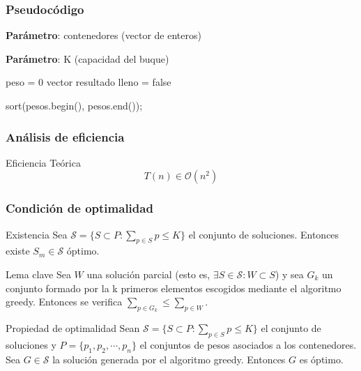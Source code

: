 \documentclass[13pt]{beamer}
\begin{document}
	\begin{frame}
		\frametitle{Pseudocódigo}
		\begin{algorithm}[H]
			\begin{minipage}{0.92\textwidth}
			\textbf{Parámetro}: contenedores (vector de enteros)
		
			\textbf{Parámetro}: K (capacidad del buque)
		
			\end{minipage}
		
			peso = 0\;
			vector resultado\;
			lleno = false\;
		
			sort(pesos.begin(), pesos.end());

			 {
			}

			
		\end{algorithm}
	\end{frame}

	\begin{frame}
		\frametitle{Análisis de eficiencia}
		\begin{block}{Eficiencia Teórica}
			$$T(n) \in \mathcal{O}(n^2)$$
		\end{block}
	\end{frame}

	\begin{frame}
		\frametitle{Condición de optimalidad}

		\begin{block}{Existencia}
			Sea $\mathcal{S} = \{S \subset P : \sum_{p \in S} p \leq K\}$ el conjunto de soluciones. Entonces
			existe $S_m \in \mathcal S$ óptimo. 
		\end{block}

		\begin{alertblock}{Lema clave}
			Sea $W$ una solución parcial (esto es, $\exists S \in \mathcal S: W \subset S$) y sea $G_k$ un conjunto formado
			por la k primeros elementos escogidos mediante el algoritmo greedy. 
			Entonces se verifica $\sum_{p \in G_k} \leq \sum_{p \in W}$. 
		\end{alertblock}

		\begin{alertblock}{Propiedad de optimalidad}
			Sean $\mathcal{S} = \{S \subset P : \sum_{p \in S} p \leq K\}$ el conjunto de soluciones y
			$P = \{p_1,p_2,\cdots,p_n\}$ el conjuntos de pesos asociados
		a los contenedores. 
			Sea $G \in \mathcal S$ la solución generada por el algoritmo greedy. Entonces
			$G$ es óptimo. 
		\end{alertblock}

	\end{frame}
\end{document}
